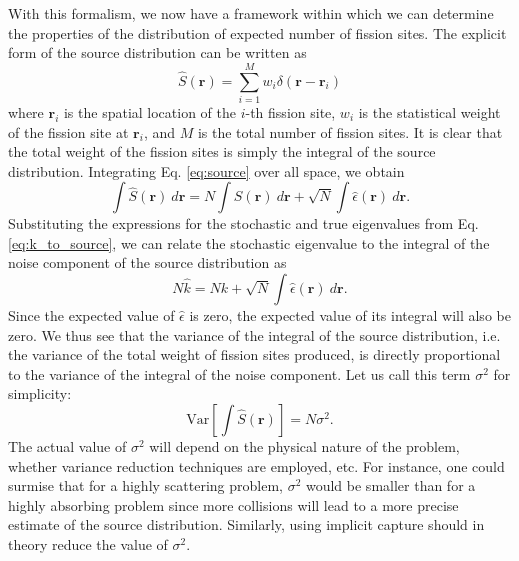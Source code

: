 \documentclass[11pt]{article}
\begin{document}
With this formalism, we now have a framework within which we can
determine the properties of the distribution of expected number of
fission sites. The explicit form of the source distribution can be
written as
\begin{equation}
  \hat{S}(\mathbf{r}) = \sum_{i=1}^{M} w_i \delta( \mathbf{r} -
  \mathbf{r}_i )
\end{equation}
where $\mathbf{r}_i$ is the spatial location of the $i$-th fission
site, $w_i$ is the statistical weight of the fission site at
$\mathbf{r}_i$, and $M$ is the total number of fission sites. It is
clear that the total weight of the fission sites is simply the
integral of the source distribution. Integrating Eq. \ref{eq:source}
over all space, we obtain
\begin{equation}
  \int \hat{S}(\mathbf{r}) \: d\mathbf{r} = N \int S(\mathbf{r}) \:
  d\mathbf{r} + \sqrt{N} \int \hat{\epsilon}(\mathbf{r}) \:
  d\mathbf{r} .
\end{equation}
Substituting the expressions for the stochastic and true eigenvalues
from Eq. \ref{eq:k_to_source}, we can relate the stochastic eigenvalue
to the integral of the noise component of the source distribution as
\begin{equation}
  N\hat{k} = Nk + \sqrt{N} \int \hat{\epsilon}(\mathbf{r}) \:
  d\mathbf{r}.
\end{equation}
Since the expected value of $\hat{\epsilon}$ is zero, the expected value of
its integral will also be zero. We thus see that the variance of the
integral of the source distribution, i.e. the variance of the total
weight of fission sites produced, is directly proportional to the
variance of the integral of the noise component. Let us call this term
$\sigma^2$ for simplicity:
\begin{equation}
  \text{Var} \left[ \int \hat{S}(\mathbf{r}) \right ] = N \sigma^2.
\end{equation}
The actual value of $\sigma^2$ will depend on the physical nature of
the problem, whether variance reduction techniques are employed,
etc. For instance, one could surmise that for a highly scattering
problem, $\sigma^2$ would be smaller than for a highly absorbing
problem since more collisions will lead to a more precise estimate of
the source distribution. Similarly, using implicit capture should in
theory reduce the value of $\sigma^2$.
\end{document}
